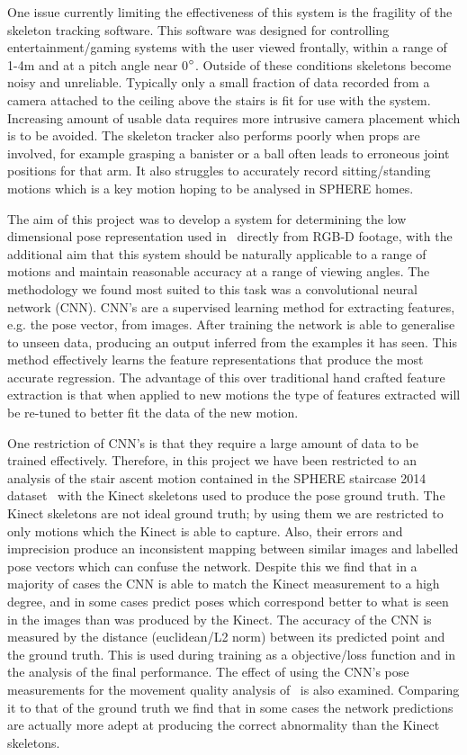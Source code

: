 \documentclass[11pt]{article} %
\begin{document}
One issue currently limiting the effectiveness of this system is the fragility of the skeleton tracking software. This software was designed for controlling entertainment/gaming systems with the user viewed frontally, within a range of 1-4m and at a pitch angle near 0$\degree$. Outside of these conditions skeletons become noisy and unreliable. Typically only a small fraction of data recorded from a camera attached to the ceiling above the stairs is fit for use with the system. Increasing amount of usable data requires more intrusive camera placement which is to be avoided. The skeleton tracker also performs poorly when props are involved, for example grasping a banister or a ball often leads to erroneous joint positions for that arm. It also struggles to accurately record sitting/standing motions which is a key motion hoping to be analysed in SPHERE homes.

The aim of this project was to develop a system for determining the low dimensional pose representation used in~\cite{Paiement} directly from RGB-D footage, with the additional aim that this system should be naturally applicable to a range of motions and maintain reasonable accuracy at a range of viewing angles. The methodology we found most suited to this task was a convolutional neural network (CNN). CNN's are a supervised learning method for extracting features, e.g. the pose vector, from images. After training the network is able to generalise to unseen data, producing an output inferred from the examples it has seen. This method effectively learns the feature representations that produce the most accurate regression. The advantage of this over traditional hand crafted feature extraction is that when applied to new motions the type of features extracted will be re-tuned to better fit the data of the new motion.


One restriction of CNN's is that they require a large amount of data to be trained effectively. Therefore, in this project we have been restricted to an analysis of the stair ascent motion contained in the SPHERE staircase 2014 dataset~\cite{Paiement} with the Kinect skeletons used to produce the pose ground truth. The Kinect skeletons are not ideal ground truth; by using them we are restricted to only motions which the Kinect is able to capture. Also, their errors and imprecision produce an inconsistent mapping between similar images and labelled pose vectors which can confuse the network. Despite this we find that in a majority of cases the CNN is able to match the Kinect measurement to a high degree, and in some cases predict poses which correspond better to what is seen in the images than was produced by the Kinect. The accuracy of the CNN is measured by the distance (euclidean/L2 norm) between its predicted point and the ground truth. This is used during training as a objective/loss function and in the analysis of the final performance. The effect of using the CNN's pose measurements for the movement quality analysis of~\cite{Paiement,Tao} is also examined. Comparing it to that of the ground truth we find that in some cases the network predictions are actually more adept at producing the correct abnormality than the Kinect skeletons.
\end{document}
